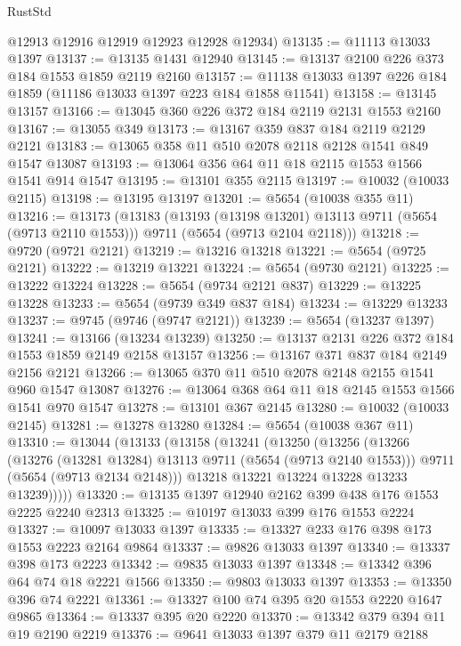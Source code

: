\begin{lexlean}{RustStd}
\begin{coremodule}
      @12913
      @12916
      @12919
      @12923
      @12928
      @12934)
@13135 := @11113 @13033 @1397
@13137 := @13135 @1431 @12940
@13145 := @13137 @2100 @226 @373 @184 @1553 @1859 @2119 @2160
@13157 := @11138 @13033 @1397 @226 @184 @1859 (@11186 @13033 @1397 @223 @184 @1858 @11541)
@13158 := @13145 @13157
@13166 := @13045 @360 @226 @372 @184 @2119 @2131 @1553 @2160
@13167 := @13055 @349
@13173 := @13167 @359 @837 @184 @2119 @2129 @2121
@13183 := @13065 @358 @11 @510 @2078 @2118 @2128 @1541 @849 @1547 @13087
@13193 := @13064 @356 @64 @11 @18 @2115 @1553 @1566 @1541 @914 @1547
@13195 := @13101 @355 @2115
@13197 := @10032 (@10033 @2115)
@13198 := @13195 @13197
@13201 := @5654 (@10038 @355 @11)
@13216 := @13173
    (@13183
      (@13193 (@13198 @13201) @13113 @9711 (@5654 (@9713 @2110 @1553)))
      @9711
      (@5654 (@9713 @2104 @2118)))
@13218 := @9720 (@9721 @2121)
@13219 := @13216 @13218
@13221 := @5654 (@9725 @2121)
@13222 := @13219 @13221
@13224 := @5654 (@9730 @2121)
@13225 := @13222 @13224
@13228 := @5654 (@9734 @2121 @837)
@13229 := @13225 @13228
@13233 := @5654 (@9739 @349 @837 @184)
@13234 := @13229 @13233
@13237 := @9745 (@9746 (@9747 @2121))
@13239 := @5654 (@13237 @1397)
@13241 := @13166 (@13234 @13239)
@13250 := @13137 @2131 @226 @372 @184 @1553 @1859 @2149 @2158 @13157
@13256 := @13167 @371 @837 @184 @2149 @2156 @2121
@13266 := @13065 @370 @11 @510 @2078 @2148 @2155 @1541 @960 @1547 @13087
@13276 := @13064 @368 @64 @11 @18 @2145 @1553 @1566 @1541 @970 @1547
@13278 := @13101 @367 @2145
@13280 := @10032 (@10033 @2145)
@13281 := @13278 @13280
@13284 := @5654 (@10038 @367 @11)
@13310 := @13044
    (@13133
      (@13158
        (@13241
          (@13250
            (@13256
              (@13266
                (@13276 (@13281 @13284) @13113 @9711 (@5654 (@9713 @2140 @1553)))
                @9711
                (@5654 (@9713 @2134 @2148)))
              @13218
              @13221
              @13224
              @13228
              @13233
              @13239)))))
@13320 := @13135 @1397 @12940 @2162 @399 @438 @176 @1553 @2225 @2240 @2313
@13325 := @10197 @13033 @399 @176 @1553 @2224
@13327 := @10097 @13033 @1397
@13335 := @13327 @233 @176 @398 @173 @1553 @2223 @2164 @9864
@13337 := @9826 @13033 @1397
@13340 := @13337 @398 @173 @2223
@13342 := @9835 @13033 @1397
@13348 := @13342 @396 @64 @74 @18 @2221 @1566
@13350 := @9803 @13033 @1397
@13353 := @13350 @396 @74 @2221
@13361 := @13327 @100 @74 @395 @20 @1553 @2220 @1647 @9865
@13364 := @13337 @395 @20 @2220
@13370 := @13342 @379 @394 @11 @19 @2190 @2219
@13376 := @9641 @13033 @1397 @379 @11 @2179 @2188

\end{coremodule}
\end{lexlean}
